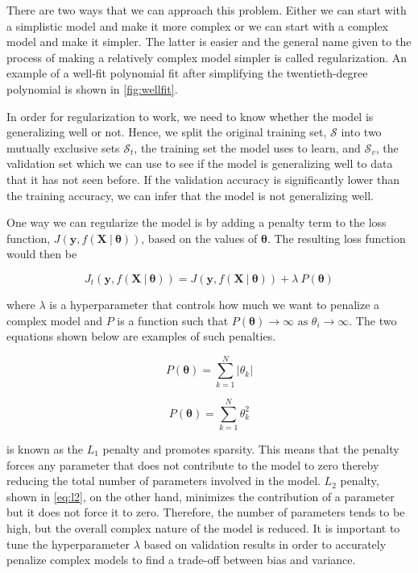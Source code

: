There are two ways that we can approach this problem. Either we can start with a simplistic model and make it more complex or we can start with a complex model and make it simpler. The latter is easier and the general name given to the process of making a relatively complex model simpler is called regularization. An example of a well-fit polynomial fit after simplifying the twentieth-degree polynomial is shown in \cref{fig:wellfit}.

In order for regularization to work, we need to know whether the model is generalizing well or not. Hence, we split the original training set, $\mathcal{S}$ into two mutually exclusive sets $\mathcal{S}_t$, the training set the model uses to learn, and $\mathcal{S}_v$, the validation set which we can use to see if the model is generalizing well to data that it has not seen before. If the validation accuracy is significantly lower than the training accuracy, we can infer that the model is not generalizing well.

One way we can regularize the model is by adding a penalty term to the loss function, $J(\mathbf{y}, f(\mathbf{X} \ | \ \boldsymbol{\theta}))$, based on the values of $\boldsymbol{\theta}$. The resulting loss function would then be

\begin{equation}
	J_{t}(\mathbf{y}, f(\mathbf{X} \ | \ \boldsymbol{\theta})) = J(\mathbf{y}, f(\mathbf{X} \ | \ \boldsymbol{\theta})) + \lambda \ P(\boldsymbol{\theta})
\end{equation}

\noindent
where $\lambda$ is a hyperparameter that controls how much we want to penalize a complex model and $P$ is a function such that $P(\boldsymbol{\theta}) \rightarrow \infty \text{ as } \theta_i \rightarrow \infty$. The two equations shown below are examples of such penalties. 


\begin{equation}
	\label{eq:l1}
	P(\boldsymbol{\boldsymbol{\theta}}) = \sum_{k = 1}^{N}{|\theta_k|}
\end{equation}

\begin{equation}
	\label{eq:l2}
	P(\boldsymbol{\theta}) = \sum_{k = 1}^{N}{\theta_k^2}
\end{equation}


 is known as the $L_1$ penalty and promotes sparsity. This means that the penalty forces any parameter that does not contribute to the model to zero thereby reducing the total number of parameters involved in the model. $L_2$ penalty, shown in \cref{eq:l2}, on the other hand, minimizes the contribution of a parameter but it does not force it to zero. Therefore, the number of parameters tends to be high, but the overall complex nature of the model is reduced. It is important to tune the hyperparameter $\lambda$ based on validation results in order to accurately penalize complex models to find a trade-off between bias and variance. 


